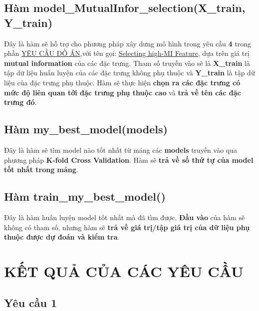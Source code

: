 \documentclass{report}
\begin{document}
\subsection{Hàm model\_MutualInfor\_selection(X\_train, Y\_train)}
    Đây là hàm sẽ hỗ trợ cho phương pháp xây dưng mô hình trong yêu cầu \textbf{4} trong phần \hyperref[sec:requirement]{\underline{YÊU CẦU ĐỒ ÁN}},với tên gọi: \hyperref[sec:selecting-MI-feature]{\underline{Selecting high-MI Feature}}, dựa trên giá trị \textbf{mutual information} của các đặc trưng. Tham số truyền vào sẽ là \textbf{X\_train} là tập dữ liệu huấn luyện của các đặc trưng không phụ thuộc và \textbf{Y\_train} là tập dữ liệu của đặc trưng phụ thuộc. Hàm sẽ thực hiện \textbf{chọn ra các đặc trưng có mức độ liên quan tới đặc trưng phụ thuộc cao} và \textbf{trả về  tên các đặc trưng đó}.

\subsection{Hàm my\_best\_model(models)}
    Đây là hàm sẽ tìm model nào tốt nhất từ mảng các \textbf{models} truyền vào qua phương pháp \textbf{K-fold Cross Validation}. Hàm sẽ \textbf{trả về số thứ tự của model tốt nhất trong mảng}.

\subsection{Hàm train\_my\_best\_model()}
    Đây là hàm huấn luyện model tốt nhất mà đã tìm được. \textbf{Đầu vào} của  hàm sẽ không có tham số, nhưng hàm sẽ \textbf{trả về giá trị/tập giá trị của dữ liệu phụ thuộc được dự đoán và kiểm tra}.

\section{KẾT QUẢ CỦA CÁC YÊU CẦU}
    \subsection{Yêu cầu 1}
\end{document}

